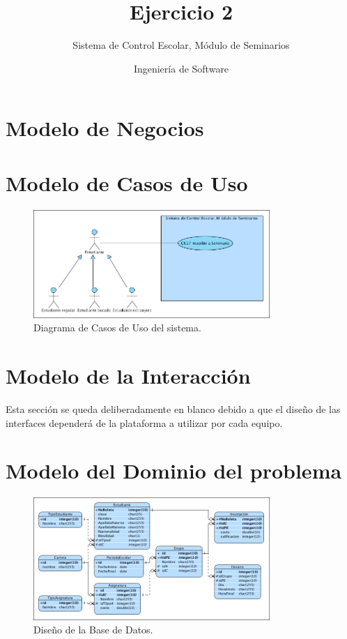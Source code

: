 \documentclass[oneside,10pt]{book}
\title{Ejercicio 2}
\subtitle{Sistema de Control Escolar, Módulo de Seminarios}
\author{Ingeniería de Software}
\begin{document}
\maketitle
\thispagestyle{empty}

\frontmatter
\tableofcontents

\mainmatter

\chapter{Modelo de Negocios}


\chapter{Modelo de Casos de Uso}
	
	\begin{figure}[htbp!]
		\centering
			\includegraphics[width=0.8\textwidth]{images/CasosDeUso}
		\caption{Diagrama de Casos de Uso del sistema.}
	\end{figure}
	

\chapter{Modelo de la Interacción}

{\color{UCInterfaceColor} 
	Esta sección se queda deliberadamente en blanco debido a que el diseño de las interfaces dependerá de la plataforma a utilizar por cada equipo.\\	
}



\chapter{Modelo del Dominio del problema}

	\begin{figure}[htbp!]
		\centering
			\includegraphics[width=0.8\textwidth]{images/baseDeDatos}
		\caption{Diseño de la Base de Datos.}
	\end{figure}
	
\end{document}
